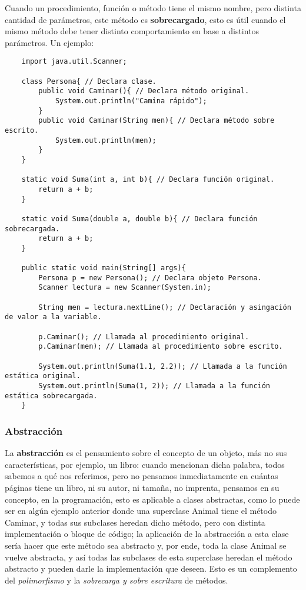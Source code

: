 Cuando un procedimiento, función o método tiene el mismo nombre, pero distinta cantidad de parámetros, este método es \textbf{sobrecargado}, esto es útil cuando el mismo método debe tener distinto comportamiento en base a distintos parámetros. Un ejemplo:
\begin{lstlisting}
    import java.util.Scanner;
    
    class Persona{ // Declara clase.
        public void Caminar(){ // Declara método original.
            System.out.println("Camina rápido");
        }
        public void Caminar(String men){ // Declara método sobre escrito.
            System.out.println(men);
        }
    }
    
    static void Suma(int a, int b){ // Declara función original.
        return a + b;
    }
    
    static void Suma(double a, double b){ // Declara función sobrecargada.
        return a + b;
    }
    
    public static void main(String[] args){
        Persona p = new Persona(); // Declara objeto Persona.
        Scanner lectura = new Scanner(System.in);
        
        String men = lectura.nextLine(); // Declaración y asingación de valor a la variable.
        
        p.Caminar(); // Llamada al procedimiento original.
        p.Caminar(men); // Llamada al procedimiento sobre escrito.
        
        System.out.println(Suma(1.1, 2.2)); // Llamada a la función estática original.
        System.out.println(Suma(1, 2)); // Llamada a la función estática sobrecargada.
    }
\end{lstlisting}


\subsubsection{Abstracción}

La \textbf{abstracción} es el pensamiento sobre el concepto de un objeto, más no sus características, por ejemplo, un libro: cuando mencionan dicha palabra, todos sabemos a qué nos referimos, pero no pensamos inmediatamente en cuántas páginas tiene un libro, ni su autor, ni tamaña, no imprenta, pensamos en su concepto, en la programación, esto es aplicable a clases abstractas, como lo puede ser en algún ejemplo anterior donde una superclase Animal tiene el método Caminar, y todas sus subclases heredan dicho método, pero con distinta implementación o bloque de código; la aplicación de la abstracción a esta clase sería hacer que este método sea abstracto y, por ende, toda la clase Animal se vuelve abstracta, y así todas las subclases de esta superclase heredan el método abstracto y pueden darle la implementación que deseen. Esto es un complemento del \textit{polimorfismo} y la \textit{sobrecarga y sobre escritura} de métodos.

